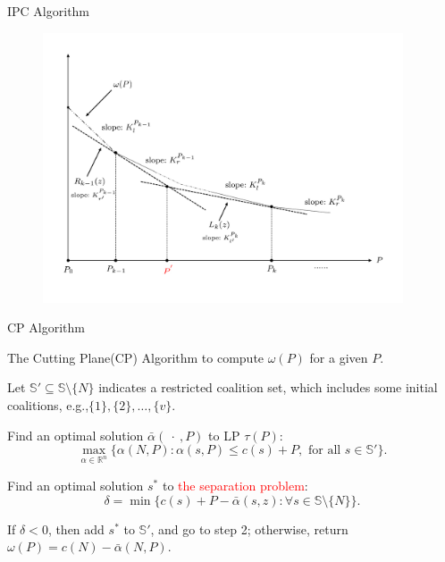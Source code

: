 \documentclass[14pt]{beamer}
\begin{document}
\begin{frame}{IPC Algorithm}
	\vspace{-3mm}
	\begin{figure}[H]
	\centering
	\includegraphics[width=0.95\textwidth]{Figures/IPC}
	\end{figure}
	\centering
\end{frame}


\begin{frame}{CP Algorithm}
	\begin{block}
		{The Cutting Plane(CP) Algorithm to compute $\omega(P)$ for a given $P$.}
	\end{block}
	\begin{description}
	  \justifying
		\footnotesize
	  \item[Step 1.] Let $\mathbb{S}'\subseteq \mathbb{S}\setminus \{N\}$ indicates a restricted coalition set, which includes some initial coalitions,
	  \vspace{10pt}
	  e.g.,$ \{1\},\{2\},\ldots,\{v\}$.
	  \item[Step 2.] Find an optimal solution $\bar{\alpha}(\ \cdot \ ,P)$ to LP $\tau(P)$:
	  \begin{equation*}
	  \max_{\alpha\in \mathbb{R}^n} \big\{ \alpha(N,P): \alpha(s,P) \leq c(s)+P, \mbox{ for all } s \in \mathbb{S}'\big\}.
	  \end{equation*}
	  \vspace{-11pt}
	  \item[Step 3.]
	  Find an optimal solution $s^*$ to \textcolor{red}{the separation problem}:
	  \begin{equation*}
	  \delta = \min \big\{ c(s)+ P -\bar{\alpha}(s,z): \forall s \in \mathbb{S} \setminus \{N\}\big\}.
	  \end{equation*}
	  \item[Step 4.]
	  If $\delta<0$, then add $s^*$ to $\mathbb{S}'$, and go to step 2; otherwise, return $\omega(P)=c(N)-\bar{\alpha}(N,P)$.
	\end{description}
\end{frame}
\end{document}

